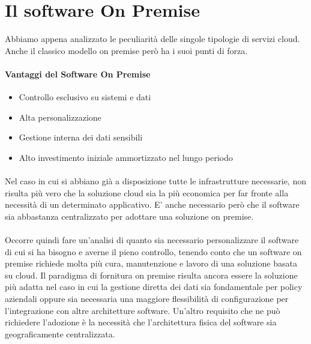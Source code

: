 \section{Il software On Premise}
Abbiamo appena analizzato le peculiarità delle singole tipologie di servizi cloud. Anche il classico modello on premise però ha i suoi punti di forza.
\paragraph{Vantaggi del Software On Premise}
\begin{itemize}
	\item Controllo esclusivo su sistemi e dati
	\item Alta personalizzazione
	\item Gestione interna dei dati sensibili
	\item Alto investimento iniziale ammortizzato nel lungo periodo
\end{itemize}

\paragraph{}
Nel caso in cui si abbiano già a disposizione tutte le infrastrutture necessarie, non risulta più vero che la soluzione cloud sia la più economica per far fronte alla necessità di un determinato applicativo. E' anche necessario però che il software sia abbastanza centralizzato per adottare una soluzione on premise.

\paragraph{}
Occorre quindi fare un'analisi di quanto sia necessario personalizzare il software di cui si ha bisogno e averne il pieno controllo, tenendo conto che un software on premise richiede molta più cura, manutenzione e lavoro di una soluzione basata su cloud. Il paradigma di fornitura on premise risulta ancora essere la soluzione più adatta nel caso in cui la gestione diretta dei dati sia fondamentale per policy aziendali oppure sia necessaria una maggiore flessibilità di configurazione per l'integrazione con altre architetture software. Un'altro requisito che ne può richiedere l'adozione è la necessità che l'architettura fisica del software sia geograficamente centralizzata.
